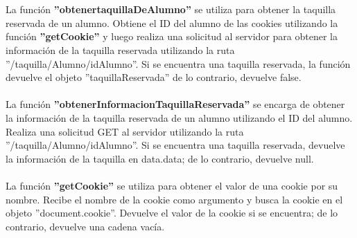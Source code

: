 \documentclass[12pt]{report}
\begin{document}
\\\\
La función \textbf{''obtenertaquillaDeAlumno''} se utiliza para obtener la taquilla reservada de un alumno. Obtiene el ID del alumno de las cookies utilizando la función \textbf{''getCookie''} y luego realiza una solicitud al servidor para obtener la información de la taquilla reservada utilizando la ruta ''/taquilla/Alumno/{idAlumno}''. Si se encuentra una taquilla reservada, la función devuelve el objeto ''taquillaReservada'' de lo contrario, devuelve false.
\\\\
La función \textbf{''obtenerInformacionTaquillaReservada''} se encarga de obtener la información de la taquilla reservada de un alumno utilizando el ID del alumno. Realiza una solicitud GET al servidor utilizando la ruta ''/taquilla/Alumno/{idAlumno}''. Si se encuentra una taquilla reservada, devuelve la información de la taquilla en data.data; de lo contrario, devuelve null.
\\\\
La función \textbf{''getCookie''} se utiliza para obtener el valor de una cookie por su nombre. Recibe el nombre de la cookie como argumento y busca la cookie en el objeto ''document.cookie''. Devuelve el valor de la cookie si se encuentra; de lo contrario, devuelve una cadena vacía.
\end{document}
